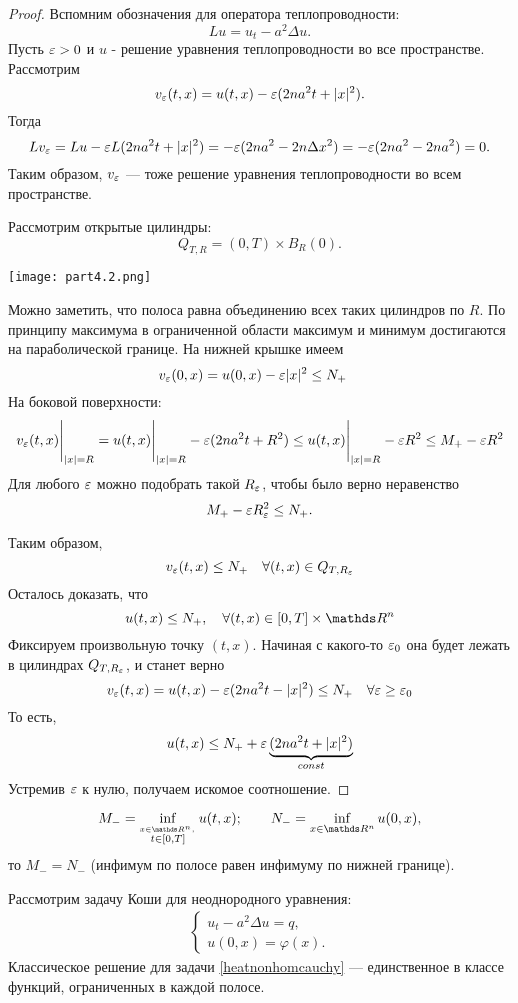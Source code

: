 \begin{proof}
Вспомним обозначения для оператора теплопроводности:
$$ Lu = u_t - a^2 \Delta u.$$
Пусть $\varepsilon >0 $ и $u$ - решение уравнения теплопроводности во все пространстве. Рассмотрим
$$v_\varepsilon(t, x) = u(t, x) - \varepsilon(2na^2t + \lvert x\rvert^2).$$
Тогда
$$Lv_\varepsilon = Lu - \varepsilon L(2na^2t + \lvert x\rvert^2) = -\varepsilon(2na^2 - 2n\Delta x^2) = -\varepsilon(2na^2 - 2na^2) = 0.$$
Таким образом, $v_\varepsilon$ --- тоже решение уравнения теплопроводности во всем пространстве.

Рассмотрим открытые цилиндры: $$Q_{T,R} = (0,T)\times B_R(0).$$

\begin{center}
\texttt{[image: part4.2.png]}
\end{center}

Можно заметить, что полоса равна объединению всех таких цилиндров по $R$. По принципу максимума в ограниченной области максимум и минимум достигаются на параболической границе. На нижней крышке имеем
$$ v_\varepsilon (0,x) = u(0,x) - \varepsilon |x|^2 \leq N_+ \quad$$
На боковой поверхности:
$$v_\varepsilon(t,x)\Bigg\rvert_{\lvert x\rvert = R} = u(t,x) \Bigg\rvert_{\lvert x\rvert = R} - \varepsilon(2na^2t + R^2) \leq u(t,x)\Bigg\rvert_{\lvert x\rvert = R} - \varepsilon R^2 \leq M_+ - \varepsilon R^2$$
Для любого $\varepsilon$ можно подобрать такой $R_\varepsilon$, чтобы было верно неравенство $$ M_+ - \varepsilon R^2_\varepsilon \leq N_+.$$

Таким образом,
$$ v_\varepsilon (t, x) \leq N_+ \quad \forall (t,x) \in {Q_{T, R_\varepsilon}}$$
Осталось доказать, что
$$u(t,x) \leq N_+, \quad \forall (t,x) \in [0, T] \times \real^n$$
Фиксируем произвольную точку $(t,x)$. Начиная с какого-то $\varepsilon_0$ она будет лежать в цилиндрах $Q_{T, R_\varepsilon}$, и станет верно
$$v_\varepsilon(t,x) = u(t,x) - \varepsilon(2na^2t - \lvert x\rvert^2) \leq N_+ \quad \forall \varepsilon \geq \varepsilon_0$$
То есть,
$$u(t,x) \leq N_+ + \varepsilon \underbrace{(2na^2t + |x|^2)}_{const}$$
Устремив $\varepsilon$ к нулю, получаем искомое соотношение.

\end{proof}

\begin{corollary}
$$M_- = \inf_{\stackrel{x \in \real^n, \,} {t \in [0, T]}}u(t,x); \qquad N_- = \inf_{x \in \real^n}u(0,x),$$
то $M_-=N_-$ (инфимум по полосе равен инфимуму по нижней границе).
\end{corollary}

\begin{corollary}[Единственность]
Рассмотрим задачу Коши для неоднородного уравнения:
\begin{align}
    \begin{cases} 
        u_t - a^2 \Delta u = q, \\
        u (0, x) = \varphi (x).
    \end{cases}
\label{heatnonhomcauchy}
\end{align}
Классическое решение для задачи \eqref{heatnonhomcauchy} --- единственное в классе функций, ограниченных в каждой полосе.
\end{corollary}

